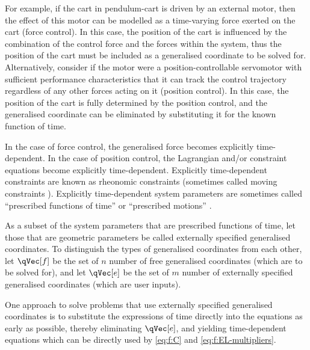 \documentclass[11pt]{article}
\begin{document}
For example, if the cart in pendulum-cart is driven by an external motor, then the effect of this motor can be modelled as a time-varying force exerted on the cart (force control). In this case, the position of the cart is influenced by the combination of the control force and the forces within the system, thus the position of the cart must be included as a generalised coordinate to be solved for. Alternatively, consider if the motor were a position-controllable servomotor with sufficient performance characteristics that it can track the control trajectory regardless of any other forces acting on it (position control). In this case, the position of the cart is fully determined by the position control, and the generalised coordinate can be eliminated by substituting it for the known function of time.

In the case of force control, the generalised force becomes explicitly time-dependent. In the case of position control, the Lagrangian and/or constraint equations become explicitly time-dependent. Explicitly time-dependent constraints are known as rheonomic constraints (sometimes called moving constraints \cite{RFb-12}). Explicitly time-dependent system parameters are sometimes called ``prescribed functions of time'' \cite{RFb-05} or ``prescribed motions'' \cite{RFb-12}.


As a subset of the system parameters that are prescribed functions of time, let those that are geometric parameters be called externally specified generalised coordinates. To distinguish the types of generalised coordinates from each other, let $\qVec[f]$ be the set of $n$ number of free generalised coordinates (which are to be solved for), and let $\qVec[e]$ be the set of $m$ number of externally specified generalised coordinates (which are user inputs).

One approach to solve problems that use externally specified generalised coordinates is to substitute the expressions of time directly into the equations as early as possible, thereby eliminating $\qVec[e]$, and yielding time-dependent equations which can be directly used by \eqref{eq:f:C} and \eqref{eq:f:EL-multipliers}.
\end{document}
